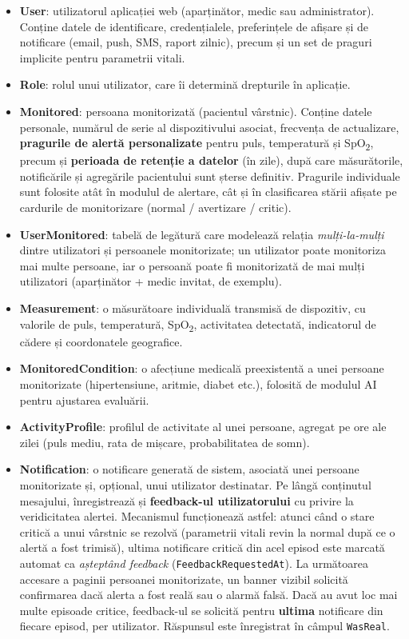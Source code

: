 \documentclass[12pt,a4paper,twoside]{article}
\newcommand{\spo}{SpO\textsubscript{2}}
\begin{document}
\begin{itemize}[leftmargin=1.5em]
\item \textbf{User}: utilizatorul aplicației web (aparținător, medic sau administrator). Conține datele de identificare, credențialele, preferințele de afișare și de notificare (email, push, SMS, raport zilnic), precum și un set de praguri implicite pentru parametrii vitali.
\item \textbf{Role}: rolul unui utilizator, care îi determină drepturile în aplicație.
\item \textbf{Monitored}: persoana monitorizată (pacientul vârstnic). Conține datele personale, numărul de serie al dispozitivului asociat, frecvența de actualizare, \textbf{pragurile de alertă personalizate} pentru puls, temperatură și \spo, precum și \textbf{perioada de retenție a datelor} (în zile), după care măsurătorile, notificările și agregările pacientului sunt șterse definitiv. Pragurile individuale sunt folosite atât în modulul de alertare, cât și în clasificarea stării afișate pe cardurile de monitorizare (normal / avertizare / critic).
\item \textbf{UserMonitored}: tabelă de legătură care modelează relația \textit{mulți-la-mulți} dintre utilizatori și persoanele monitorizate; un utilizator poate monitoriza mai multe persoane, iar o persoană poate fi monitorizată de mai mulți utilizatori (aparținător + medic invitat, de exemplu).
\item \textbf{Measurement}: o măsurătoare individuală transmisă de dispozitiv, cu valorile de puls, temperatură, \spo, activitatea detectată, indicatorul de cădere și coordonatele geografice.
\item \textbf{MonitoredCondition}: o afecțiune medicală preexistentă a unei persoane monitorizate (hipertensiune, aritmie, diabet etc.), folosită de modulul AI pentru ajustarea evaluării.
\item \textbf{ActivityProfile}: profilul de activitate al unei persoane, agregat pe ore ale zilei (puls mediu, rata de mișcare, probabilitatea de somn).
\item \textbf{Notification}: o notificare generată de sistem, asociată unei persoane monitorizate și, opțional, unui utilizator destinatar. Pe lângă conținutul mesajului, înregistrează și \textbf{feedback-ul utilizatorului} cu privire la veridicitatea alertei. Mecanismul funcționează astfel: atunci când o stare critică a unui vârstnic se rezolvă (parametrii vitali revin la normal după ce o alertă a fost trimisă), ultima notificare critică din acel episod este marcată automat ca \textit{așteptând feedback} (\texttt{FeedbackRequestedAt}). La următoarea accesare a paginii persoanei monitorizate, un banner vizibil solicită confirmarea dacă alerta a fost reală sau o alarmă falsă. Dacă au avut loc mai multe episoade critice, feedback-ul se solicită pentru \textbf{ultima} notificare din fiecare episod, per utilizator. Răspunsul este înregistrat în câmpul \texttt{WasReal}.

\end{itemize}
\end{document}
